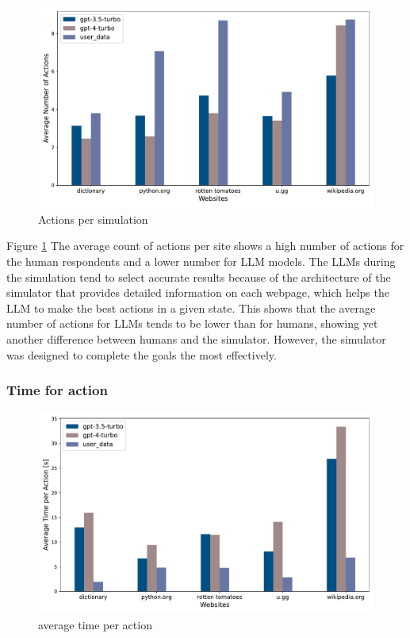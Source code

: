 \begin{figure}[ht]
    \centering
    \includegraphics[width=1\textwidth]{obrazky-figures/actions_count_comparison.pdf}
    \caption{Actions per simulation}
    \label{aps_comp}
\end{figure}

Figure \ref{aps_comp} The average count of actions per site shows a high number of actions for the human respondents and a lower number for LLM models. The LLMs during the simulation tend to select accurate results because of the architecture of the simulator that provides detailed information on each webpage, which helps the LLM to make the best actions in a given state. This shows that the average number of actions for LLMs tends to be lower than for humans, showing yet another difference between humans and the simulator. However, the simulator was designed to complete the goals the most effectively.

\subsubsection{Time for action}

\begin{figure}[H]
    \centering
    \includegraphics[width=1\textwidth]{obrazky-figures/average_time_per_action_comparison.pdf}
    \caption{average time per action}
    \label{tfa}
\end{figure}

